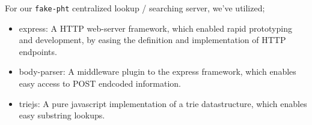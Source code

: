 For our \verb|fake-pht| centralized lookup / searching server, we've utilized;
\begin{itemize}
\item express: A HTTP web-server framework, which enabled rapid prototyping and
        development, by easing the definition and implementation of HTTP endpoints.
\item body-parser: A middleware plugin to the express framework, which enables 
        easy access to POST endcoded information.
\item triejs: A pure javascript implementation of a trie datastructure, which 
        enables easy substring lookups.
\end{itemize}
